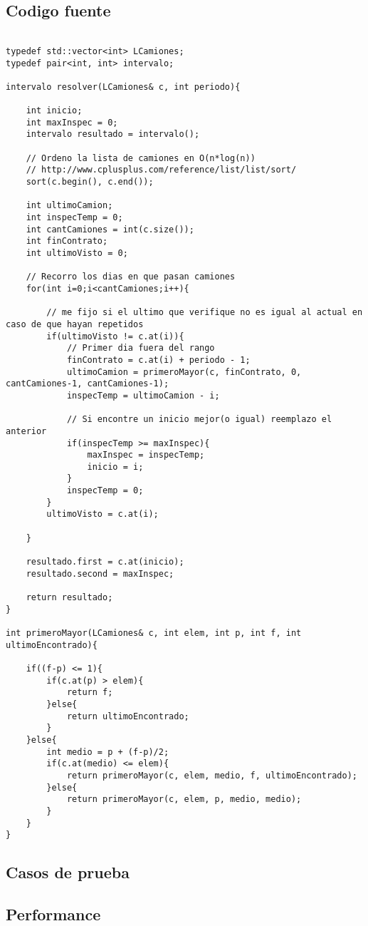 \subsection{Codigo fuente}

\begin{lstlisting}

typedef std::vector<int> LCamiones;
typedef pair<int, int> intervalo;

intervalo resolver(LCamiones& c, int periodo){
	
	int inicio;
	int maxInspec = 0;
	intervalo resultado = intervalo();

	// Ordeno la lista de camiones en O(n*log(n))
	// http://www.cplusplus.com/reference/list/list/sort/
	sort(c.begin(), c.end());

	int ultimoCamion;
	int inspecTemp = 0;
	int cantCamiones = int(c.size());
	int finContrato;
	int ultimoVisto = 0;

	// Recorro los dias en que pasan camiones
	for(int i=0;i<cantCamiones;i++){
		
		// me fijo si el ultimo que verifique no es igual al actual en caso de que hayan repetidos
		if(ultimoVisto != c.at(i)){
			// Primer dia fuera del rango
			finContrato = c.at(i) + periodo - 1;
			ultimoCamion = primeroMayor(c, finContrato, 0, cantCamiones-1, cantCamiones-1);
			inspecTemp = ultimoCamion - i;

			// Si encontre un inicio mejor(o igual) reemplazo el anterior
			if(inspecTemp >= maxInspec){
				maxInspec = inspecTemp;
				inicio = i;
			}
			inspecTemp = 0;
		}
		ultimoVisto = c.at(i);

	}

	resultado.first = c.at(inicio);
	resultado.second = maxInspec;
	
	return resultado;
}

int primeroMayor(LCamiones& c, int elem, int p, int f, int ultimoEncontrado){
	
	if((f-p) <= 1){
		if(c.at(p) > elem){
			return f;
		}else{
			return ultimoEncontrado;
		}
	}else{
		int medio = p + (f-p)/2;
		if(c.at(medio) <= elem){
			return primeroMayor(c, elem, medio, f, ultimoEncontrado);
		}else{
			return primeroMayor(c, elem, p, medio, medio);
		}
	}
}

\end{lstlisting}

\subsection{Casos de prueba}

\subsection{Performance}
